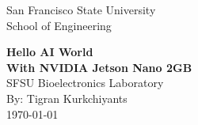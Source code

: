 \documentclass[letter, 12pt]{article}
\begin{document}
	
	\begin{titlepage}
		\thispagestyle{empty}
		\begin{center}
			\large San Francisco State University \\
			School of Engineering
		\end{center}
		\vspace*{\fill}
		
		\begin{center}
			\textbf{\LARGE Hello AI World} \vspace{1.5ex}\\
			\textbf{\LARGE With NVIDIA Jetson Nano 2GB} \vspace{1ex}\\
			\Large SFSU Bioelectronics Laboratory \\
			\Large By: Tigran Kurkchiyants \\
			
			\today
		\end{center}
		
		\vfill
	\end{titlepage}
	
	\newpage
	\tableofcontents
	
	
	\newpage
	
\end{document}
